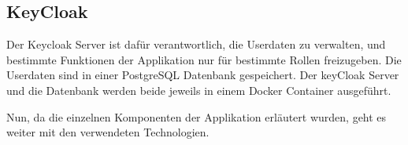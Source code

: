 \subsection{KeyCloak}

Der Keycloak Server ist dafür verantwortlich, die Userdaten zu verwalten, und bestimmte Funktionen der Applikation nur für bestimmte Rollen freizugeben. 
Die Userdaten sind in einer PostgreSQL Datenbank gespeichert. Der keyCloak Server und die Datenbank werden beide jeweils in einem Docker Container ausgeführt.

Nun, da die einzelnen Komponenten der Applikation erläutert wurden, geht es weiter mit den verwendeten Technologien.